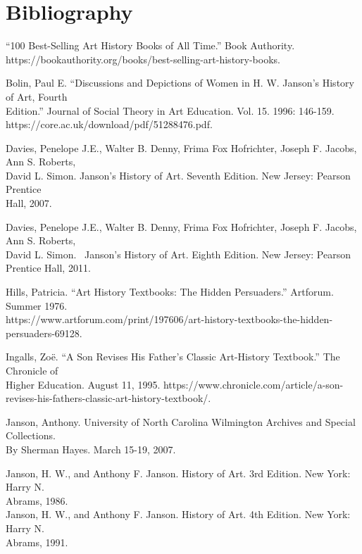 \documentclass[
  letterpaper,
  DIV=11,
  numbers=noendperiod]{scrreprt}
\begin{document}
\hypertarget{bibliography}{%
\chapter{Bibliography}\label{bibliography}}

``100 Best-Selling Art History Books of All Time.'' Book Authority.\\
https://bookauthority.org/books/best-selling-art-history-books.~~

Bolin, Paul E. ``Discussions and Depictions of Women in H. W. Janson's
History of Art, Fourth\\
Edition.'' Journal of Social Theory in Art Education. Vol. 15. 1996:
146-159.\\
https://core.ac.uk/download/pdf/51288476.pdf.

Davies, Penelope J.E., Walter B. Denny, Frima Fox Hofrichter, Joseph F.
Jacobs, Ann S. Roberts,\\
David L. Simon. Janson's History of Art. Seventh Edition. New Jersey:
Pearson Prentice\\
Hall, 2007.

Davies, Penelope J.E., Walter B. Denny, Frima Fox Hofrichter, Joseph F.
Jacobs, Ann S. Roberts,\\
David L. Simon.~ Janson's History of Art. Eighth Edition. New Jersey:
Pearson\\
Prentice Hall, 2011.

Hills, Patricia. ``Art History Textbooks: The Hidden Persuaders.''
Artforum. Summer 1976.\\
https://www.artforum.com/print/197606/art-history-textbooks-the-hidden-\\
persuaders-69128.~

Ingalls, Zoë. ``A Son Revises His Father's Classic Art-History
Textbook.'' The Chronicle of\\
Higher Education. August 11, 1995.
https://www.chronicle.com/article/a-son-\\
revises-his-fathers-classic-art-history-textbook/.

Janson, Anthony. University of North Carolina Wilmington Archives and
Special Collections.\\
By Sherman Hayes. March 15-19, 2007.~

Janson, H. W., and Anthony F. Janson. History of Art. 3rd Edition. New
York: Harry N.\\
Abrams, 1986.\\
Janson, H. W., and Anthony F. Janson. History of Art. 4th Edition. New
York: Harry N.\\
Abrams, 1991.
\end{document}
